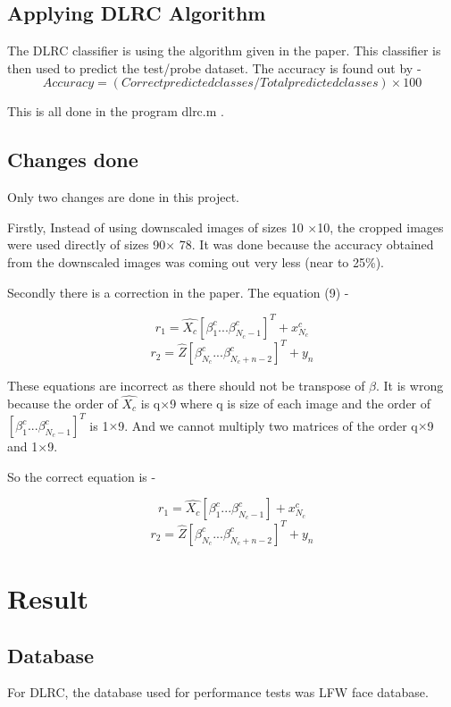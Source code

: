 \documentclass[a4paper]{article}
\begin{document}
		\subsection{Applying DLRC Algorithm}
			The DLRC classifier is using the algorithm given in the paper. This classifier is then used to predict the test/probe dataset. The accuracy is found out by -
			\[ Accuracy = (Correct predicted classes / Total predicted classes)  \times 100\]
			
			This is all done in the program dlrc.m .
			
		\subsection{Changes done}
			Only two changes are done in this project.
			
			Firstly, Instead of using downscaled images of sizes 10 ${\times}$10, the cropped images were used directly of sizes 90${\times}$ 78. It was done because the accuracy obtained from the downscaled images was coming out very less (near to 25\%).
			
			Secondly there is a correction in the paper. The equation (9) -
			
			\[  r_{1} = \hat{X_{c}}\left[ \beta^{c}_{1} ... \beta^{c}_{N_{c}-1}  \right]^{T} + x^{c}_{N_{c}} \]
			\[  r_{2} = \hat{Z}\left[ \beta^{c}_{N_{c}} ... \beta^{c}_{N_{c}+n-2}  \right]^{T} + y_{n} \]
			
			These equations are incorrect as there should not be transpose of ${\beta}$. It is wrong because the order of ${\hat{X_{c}}}$ is q${\times}$9 where q is size of each image and the order of ${\left[ \beta^{c}_{1} ... \beta^{c}_{N_{c}-1}  \right]^{T}}$ is 1${\times}$9. And we cannot multiply two matrices of the order q${\times}$9 and 1${\times}$9.
			
			So the correct equation is -
			
			\[  r_{1} = \hat{X_{c}}\left[ \beta^{c}_{1} ... \beta^{c}_{N_{c}-1}  \right] + x^{c}_{N_{c}} \]				
			\[  r_{2} = \hat{Z}\left[ \beta^{c}_{N_{c}} ... \beta^{c}_{N_{c}+n-2}  \right]^{T} + y_{n} \]
			
			
	\section{Result}
	
		\subsection{Database}
		For  DLRC, the database used for performance tests was LFW face database.
		
\end{document}
